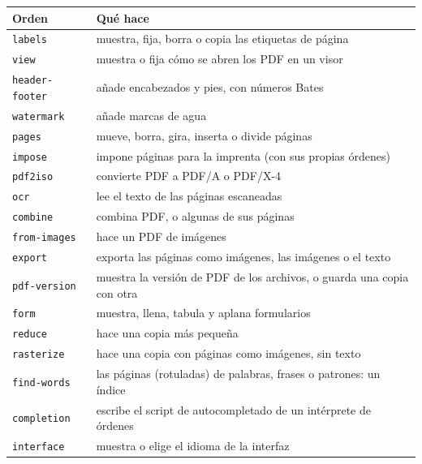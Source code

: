 \documentclass[12pt,
              article,
              oneside
              ]{memoir}
\begin{document}
%
\begin{longtable}{@{}lp{}@{}}
\toprule
Orden & Qué hace\\
\midrule
\endhead
\texttt{labels} & muestra, fija, borra o copia las etiquetas de página\\
\texttt{view} & muestra o fija cómo se abren los PDF en un visor\\
\texttt{header-footer} & añade encabezados y pies, con números Bates\\
\texttt{watermark} & añade marcas de agua\\
\texttt{pages} & mueve, borra, gira, inserta o divide páginas\\
\texttt{impose} & impone páginas para la imprenta (con sus propias órdenes)\\
\texttt{pdf2iso} & convierte PDF a PDF/A o PDF/X-4\\
\texttt{ocr} & lee el texto de las páginas escaneadas\\
\texttt{combine} & combina PDF, o algunas de sus páginas\\
\texttt{from-images} & hace un PDF de imágenes\\
\texttt{export} & exporta las páginas como imágenes, las imágenes o el texto\\
\texttt{pdf-version} & muestra la versión de PDF de los archivos, o guarda una copia con otra\\
\texttt{form} & muestra, llena, tabula y aplana formularios\\
\texttt{reduce} & hace una copia más pequeña\\
\texttt{rasterize} & hace una copia con páginas como imágenes, sin texto\\
\texttt{find-words} & las páginas (rotuladas) de palabras, frases o patrones: un índice\\
\texttt{completion} & escribe el script de autocompletado de un intérprete de órdenes\\
\texttt{interface} & muestra o elige el idioma de la interfaz\\
\bottomrule
\end{longtable}
\end{document}
